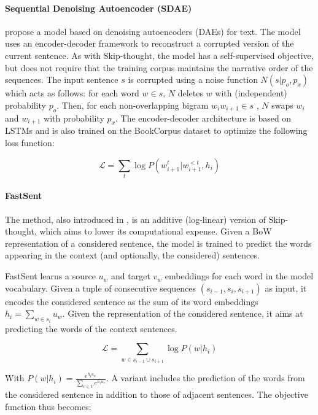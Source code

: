 \paragraph{Sequential Denoising Autoencoder (SDAE)} \textcite{hill_16} propose a model based on denoising autoencoders (DAEs) for text. The model uses an encoder-decoder framework to reconstruct a corrupted version of the current sentence. As with Skip-thought, the model has a self-supervised objective, but does not require that the training corpus maintains the narrative order of the sequences. The input sentence $s$ is corrupted using a noise function $N(s|p_o, p_x)$ which acts as follows: for each word $w \in s$, $N$ deletes $w$ with (independent) probability $p_o$. Then, for each non-overlapping bigram $w_iw_{i+1} \in s$ , $N$ swaps $w_i$ and $w_{i+1}$ with probability $p_x$. The encoder-decoder architecture is based on LSTMs and is also trained on the BookCorpus dataset to optimize the following loss function:

\begin{equation*}
    \mathcal{L} = \sum_t \log P(w_{i+1}^t | w_{i+1}^{<t}, h_i)
\end{equation*}

\paragraph{FastSent} The method, also introduced in \textcite{hill_16}, is an additive (log-linear) version of Skip-thought, which aims to lower its computational expense. Given a BoW representation of a considered sentence, the model is trained to predict the words appearing in the context (and optionally, the considered) sentences. %

FastSent learns a source $u_w$ and target $v_w$ embeddings for each word in the model vocabulary. Given a tuple of consecutive sequences $(s_{i-1}, s_i, s_{i+1})$ as input, it encodes the considered sentence as the sum of its word embeddings $h_i = \sum_{w \in s_i}u_w$. Given the representation of the considered sentence, it aims at predicting the words of the context sentences. 

\begin{equation*}
    \mathcal{L} = \sum_{w \in s_{i-1} \cup s_{i+1}} \log P(w | h_i)
\end{equation*}

With $P(w | h_i) = \frac{e^{h_i u_w}}{\sum_{v \in V}e^{h_i u_v}}$. A variant includes the prediction of the words from the considered sentence in addition to those of adjacent sentences. The objective function thus becomes:

